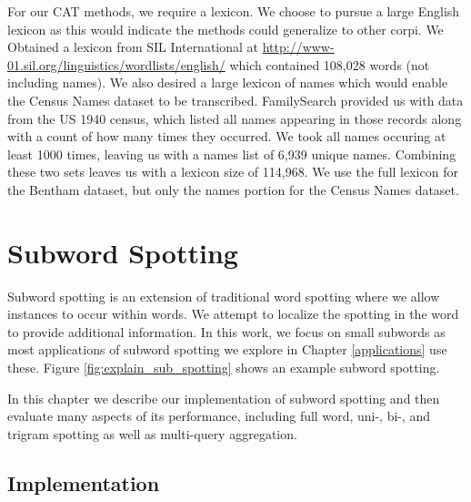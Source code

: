 \documentclass[ms,electronic,twosidetoc,letterpaper,chaptercenter,parttop,lol,lof,lot]{byumsphd}
\begin{document}
For our CAT methods, we require a lexicon. We choose to pursue a large English lexicon as this would indicate the methods could generalize to other corpi. We Obtained a lexicon from SIL International at \url{http://www-01.sil.org/linguistics/wordlists/english/} which contained 108,028 words (not including names). We also desired a large lexicon of names which would enable the Census Names dataset to be transcribed. FamilySearch provided us with data from the US 1940 census, which listed all names appearing in those records along with a count of how many times they occurred. We took all names occuring at least 1000 times, leaving us with a names list of 6,939 unique names. Combining these two sets leaves us with a lexicon size of 114,968. We use the full lexicon for the Bentham dataset, but only the names portion for the Census Names dataset.

\chapter{Subword Spotting}\label{subwordspotting}

Subword spotting is an extension of traditional word spotting where we allow instances to occur within words. We attempt to localize the spotting in the word to provide additional information. In this work, we focus on small subwords as most applications of subword spotting we explore in Chapter \ref{applications} use these. Figure \ref{fig:explain_sub_spotting} shows an example subword spotting.

In this chapter we describe our implementation of subword spotting and then evaluate many aspects of its performance, including full word, uni-, bi-, and trigram spotting as well as multi-query aggregation.


\section{Implementation}
\end{document}
